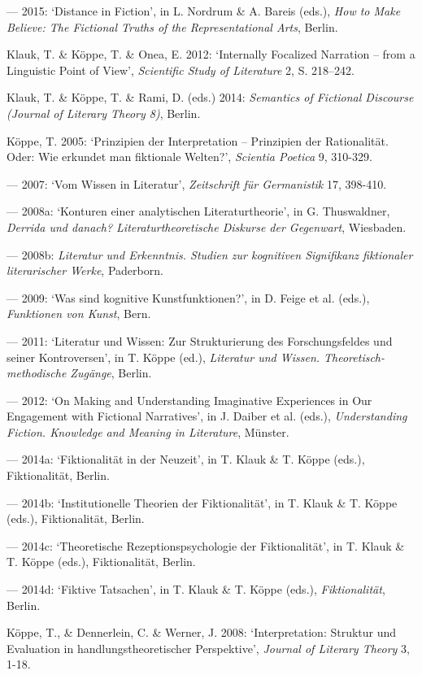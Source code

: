 \begin{hangparas}{.5cm}{1}
--- 2015: `Distance in Fiction', in L. Nordrum \& A. Bareis (eds.), \emph{How to Make Believe: The Fictional Truths of the Representational Arts}, Berlin.

Klauk, T. \& K\"oppe, T. \& Onea, E. 2012: `Internally Focalized Narration -- from a Linguistic Point of View', \emph{Scientific Study of Literature} 2, S. 218--242.

Klauk, T. \& K\"oppe, T. \& Rami, D. (eds.) 2014: \emph{Semantics of Fictional Discourse (Journal of Literary Theory 8)}, Berlin.

K\"oppe, T. 2005: `Prinzipien der Interpretation -- Prinzipien der Rationalit\"at. Oder: Wie erkundet man fiktionale Welten?', \emph{Scientia Poetica} 9, 310-329.

--- 2007: `Vom Wissen in Literatur', \emph{Zeitschrift f\"ur Germanistik} 17, 398-410.

--- 2008a: `Konturen einer analytischen Literaturtheorie', in G. Thuswaldner, \emph{Derrida und danach? Literaturtheoretische Diskurse der Gegenwart}, Wiesbaden.

--- 2008b: \emph{Literatur und Erkenntnis. Studien zur kognitiven Signifikanz fiktionaler literarischer Werke}, Paderborn. 

--- 2009: `Was sind kognitive Kunstfunktionen?', in D. Feige et al. (eds.), \emph{Funktionen von Kunst}, Bern.

--- 2011: `Literatur und Wissen: Zur Strukturierung des Forschungsfeldes und seiner Kontroversen', in T. K\"oppe (ed.), \emph{Literatur und Wissen. Theoretisch-methodische Zug\"ange}, Berlin.

--- 2012: `On Making and Understanding Imaginative Experiences in Our Engagement with Fictional Narratives', in J. Daiber et al. (eds.), \emph{Understanding Fiction. Knowledge and Meaning in Literature}, M\"unster.

--- 2014a: `Fiktionalit\"at in der Neuzeit', in T. Klauk \& T. K\"oppe (eds.), Fiktionalit\"at, Berlin.

--- 2014b: `Institutionelle Theorien der Fiktionalit\"at', in T. Klauk \& T. K\"oppe (eds.), Fiktionalit\"at, Berlin. 

--- 2014c: `Theoretische Rezeptionspsychologie der Fiktionalit\"at', in T. Klauk \& T. K\"oppe (eds.), Fiktionalit\"at, Berlin.

--- 2014d: `Fiktive Tatsachen', in T. Klauk \& T. K\"oppe (eds.), \emph{Fiktionalit\"at}, Berlin.

K\"oppe, T., \& Dennerlein, C. \& Werner, J. 2008: `Interpretation: Struktur und Evaluation in handlungstheoretischer Perspektive', \emph{Journal of Literary Theory} 3, 1-18.


\end{hangparas}
